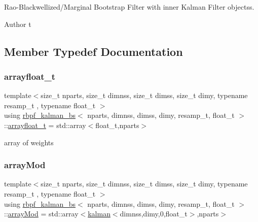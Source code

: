 Rao-\/\+Blackwellized/\+Marginal Bootstrap Filter with inner Kalman Filter objectss. 

\begin{DoxyAuthor}{Author}
t 
\end{DoxyAuthor}


\subsection{Member Typedef Documentation}
\mbox{\label{classrbpf__kalman__bs_ae45e5522570234a1126f28fbe6a13c75}} 
\subsubsection{\texorpdfstring{arrayfloat\+\_\+t}{arrayfloat\_t}}
{\footnotesize\ttfamily template$<$size\+\_\+t nparts, size\+\_\+t dimnss, size\+\_\+t dimss, size\+\_\+t dimy, typename resamp\+\_\+t , typename float\+\_\+t $>$ \\
using \hyperlink{classrbpf__kalman__bs}{rbpf\+\_\+kalman\+\_\+bs}$<$ nparts, dimnss, dimss, dimy, resamp\+\_\+t, float\+\_\+t $>$\+::\hyperlink{classrbpf__kalman__bs_ae45e5522570234a1126f28fbe6a13c75}{arrayfloat\+\_\+t} =  std\+::array$<$float\+\_\+t,nparts$>$}

array of weights \mbox{\label{classrbpf__kalman__bs_a009e7dcc39c6a256a6de6ce36df7d033}} 
\subsubsection{\texorpdfstring{array\+Mod}{arrayMod}}
{\footnotesize\ttfamily template$<$size\+\_\+t nparts, size\+\_\+t dimnss, size\+\_\+t dimss, size\+\_\+t dimy, typename resamp\+\_\+t , typename float\+\_\+t $>$ \\
using \hyperlink{classrbpf__kalman__bs}{rbpf\+\_\+kalman\+\_\+bs}$<$ nparts, dimnss, dimss, dimy, resamp\+\_\+t, float\+\_\+t $>$\+::\hyperlink{classrbpf__kalman__bs_a009e7dcc39c6a256a6de6ce36df7d033}{array\+Mod} =  std\+::array$<$\hyperlink{classkalman}{kalman}$<$dimnss,dimy,0,float\+\_\+t$>$,nparts$>$}

